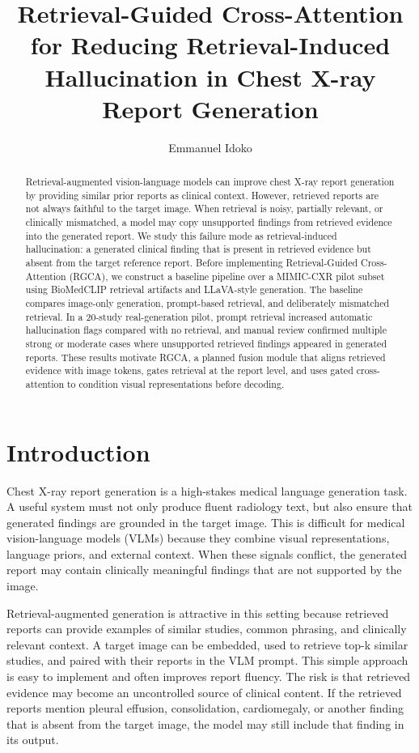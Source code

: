 \documentclass[11pt]{article}
\begin{document}
\title{Retrieval-Guided Cross-Attention for Reducing Retrieval-Induced Hallucination in Chest X-ray Report Generation}
\author{Emmanuel Idoko}
\date{}
\maketitle

\begin{abstract}
Retrieval-augmented vision-language models can improve chest X-ray report generation by providing similar prior reports as clinical context. However, retrieved reports are not always faithful to the target image. When retrieval is noisy, partially relevant, or clinically mismatched, a model may copy unsupported findings from retrieved evidence into the generated report. We study this failure mode as retrieval-induced hallucination: a generated clinical finding that is present in retrieved evidence but absent from the target reference report. Before implementing Retrieval-Guided Cross-Attention (RGCA), we construct a baseline pipeline over a MIMIC-CXR pilot subset using BioMedCLIP retrieval artifacts and LLaVA-style generation. The baseline compares image-only generation, prompt-based retrieval, and deliberately mismatched retrieval. In a 20-study real-generation pilot, prompt retrieval increased automatic hallucination flags compared with no retrieval, and manual review confirmed multiple strong or moderate cases where unsupported retrieved findings appeared in generated reports. These results motivate RGCA, a planned fusion module that aligns retrieved evidence with image tokens, gates retrieval at the report level, and uses gated cross-attention to condition visual representations before decoding.
\end{abstract}

\section{Introduction}

Chest X-ray report generation is a high-stakes medical language generation task. A useful system must not only produce fluent radiology text, but also ensure that generated findings are grounded in the target image. This is difficult for medical vision-language models (VLMs) because they combine visual representations, language priors, and external context. When these signals conflict, the generated report may contain clinically meaningful findings that are not supported by the image.

Retrieval-augmented generation is attractive in this setting because retrieved reports can provide examples of similar studies, common phrasing, and clinically relevant context. A target image can be embedded, used to retrieve top-k similar studies, and paired with their reports in the VLM prompt. This simple approach is easy to implement and often improves report fluency. The risk is that retrieved evidence may become an uncontrolled source of clinical content. If the retrieved reports mention pleural effusion, consolidation, cardiomegaly, or another finding that is absent from the target image, the model may still include that finding in its output.
\end{document}
